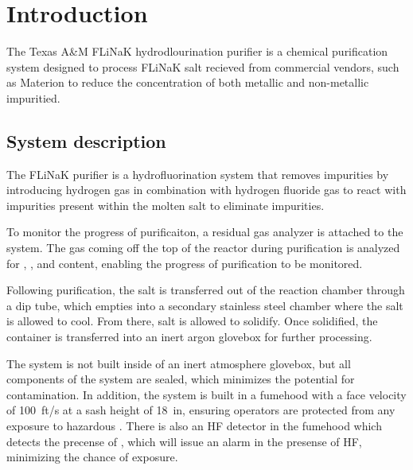 %
%

\section{Introduction}

The Texas A\&M FLiNaK hydrodlourination purifier is a chemical
purification system
designed to process FLiNaK salt recieved from commercial vendors, such
as Materion \cite{materion} to reduce the concentration of both metallic
and non-metallic impuritied. \par

\subsection{System description}

The FLiNaK purifier is a hydrofluorination system that removes impurities by
introducing hydrogen gas in combination with hydrogen fluoride gas to react with
impurities present within the molten salt to eliminate impurities. \par

To monitor the progress of purificaiton, a residual gas analyzer is attached
to the system. The gas coming off the top of the reactor during purification is
analyzed for , , and  content, enabling the progress of
purification to be monitored. \par

Following purification, the salt is transferred out of the reaction chamber
through a dip tube, which empties into a secondary stainless steel chamber
where the salt is allowed to cool. From there, salt is allowed to solidify.
Once solidified, the container is transferred into an inert argon glovebox
for further processing. \par

The system is not built inside of an inert atmosphere glovebox, but all
components of the system are sealed, which minimizes the potential for
contamination. In addition, the system is built in a fumehood with a
face velocity of \SI{100}{ft/s} at a sash height of \SI{18}{in},
ensuring operators are protected from any exposure to hazardous .
There is also an HF detector in the fumehood which detects the precense of
, which will issue an alarm in the presense of HF, minimizing the
chance of exposure. \par

